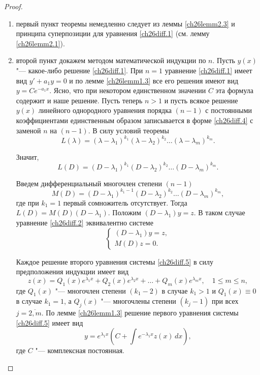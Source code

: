 \begin{proof}
\begin{enumerate}[wide, labelwidth=!, labelindent=0pt] 
\item
первый пункт теоремы немедленно следует из леммы \ref{ch26lemm2.3} и принципа суперпозиции для уравнения \eqref{ch26diff.1} (см. лемму \ref{ch26lemm2.1}).
\item второй пункт докажем методом математической индукции по $n$. Пусть $y(x)$ "--- какое-либо решение \eqref{ch26diff.1}. При $n=1$ уравнение \eqref{ch26diff.1} имеет вид $y'+a_1y=0$  и по лемме \ref{ch26lemm1.3} все его решения имеют вид $y=Ce^{-a_1x}$. Ясно, что при некотором единственном значении $C$ эта формула содержит и наше решение. Пусть теперь $n>1$  и пусть всякое решение $y(x)$ линейного однородного уравнения порядка $(n-1)$ с постоянными коэффициентами единственным образом записывается в форме \eqref{ch26diff.4} с заменой $n$ на $(n-1)$.
В силу условий теоремы 
$$
L(\lambda)=(\lambda-\lambda_1)^{k_1}(\lambda-\lambda_2)^{k_2}\dots(\lambda-\lambda_m)^{k_m}.
$$

Значит,
$$
L(D)=(D-\lambda_1)^{k_1}(D-\lambda_2)^{k_2}\dots(D-\lambda_m)^{k_m}.
$$

Введем дифференциальный многочлен степени $(n-1)$
$$
M(D)=(D-\lambda_1)^{k_1-1}(D-\lambda_2)^{k_2}\dots(D-\lambda_m)^{k_m},
$$
где при $k_1=1$ первый сомножитель отсутствует. Тогда $L(D)=M(D)(D-\lambda_1)$. Положим $(D-\lambda_1)y=z$. В таком случае уравнение \eqref{ch26diff.2} эквивалентно системе
\begin{equation}\label{ch26diff.5}
\begin{cases}
(D-\lambda_1)y=z,\\M(D)z=0.
\end{cases}
\end{equation}

Каждое решение второго уравнения системы \eqref{ch26diff.5} в силу предположения индукции имеет вид
$$
z(x)=Q_1(x)e^{\lambda_1x}+Q_2(x)e^{\lambda_2x}+\dots+Q_m(x)e^{\lambda_mx},\quad 1\le m\le n,
$$
где $Q_1(x)$ "--- многочлен степени $(k_1-2)$ в случае $k_1>1$ и $Q_1(x)\equiv 0$ в случае $k_1=1$, а $Q_j(x)$ "--- многочлены степени $(k_j-1)$ при всех $j=\overline{2,m}$. По лемме \ref{ch26lemm1.3} решение первого уравнения системы \eqref{ch26diff.5} имеет вид
\begin{equation}\label{ch26diff.6}
y=e^{\lambda_1x}\left(C+\int e^{-\lambda_1x} z(x)\, dx\right),
\end{equation}
где $C$ "--- комплексная постоянная.


\end{enumerate}
\end{proof}
